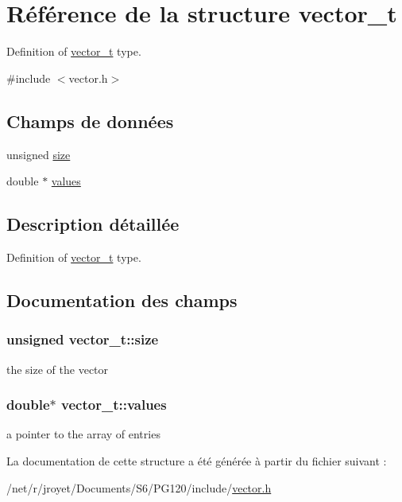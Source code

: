\hypertarget{structvector__t}{\section{Référence de la structure vector\-\_\-t}
\label{structvector__t}
}


Definition of \hyperlink{structvector__t}{vector\-\_\-t} type.  




{\ttfamily \#include $<$vector.\-h$>$}

\subsection*{Champs de données}
\begin{DoxyCompactItemize}
\item 
unsigned \hyperlink{structvector__t_abce365580771c12c4040a5c91cd41b73}{size}
\item 
double $\ast$ \hyperlink{structvector__t_af87cb33c139441c2a48ad655a0b5461a}{values}
\end{DoxyCompactItemize}


\subsection{Description détaillée}
Definition of \hyperlink{structvector__t}{vector\-\_\-t} type. 

\subsection{Documentation des champs}
\hypertarget{structvector__t_abce365580771c12c4040a5c91cd41b73}{
\subsubsection[{size}]{\setlength{\rightskip}{0pt plus 5cm}unsigned vector\-\_\-t\-::size}}\label{structvector__t_abce365580771c12c4040a5c91cd41b73}
the size of the vector \hypertarget{structvector__t_af87cb33c139441c2a48ad655a0b5461a}{
\subsubsection[{values}]{\setlength{\rightskip}{0pt plus 5cm}double$\ast$ vector\-\_\-t\-::values}}\label{structvector__t_af87cb33c139441c2a48ad655a0b5461a}
a pointer to the array of entries 

La documentation de cette structure a été générée à partir du fichier suivant \-:\begin{DoxyCompactItemize}
\item 
/net/r/jroyet/\-Documents/\-S6/\-P\-G120/include/\hyperlink{vector_8h}{vector.\-h}\end{DoxyCompactItemize}
